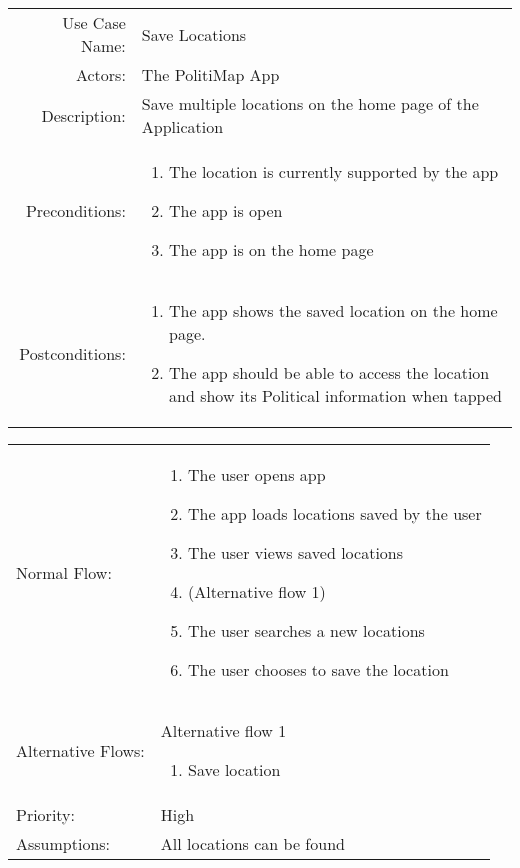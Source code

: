 \documentclass{beamer}
\begin{document}
\begin{frame}
\begin{tabu}{rX}
  Use Case Name: & Save Locations\\
  Actors: & The PolitiMap App\\
  Description: & Save multiple locations on the home page of the Application\\
  Preconditions: &
  \begin{enumerate}
  \item The location is currently supported by the app
  \item The app is open
  \item The app is on the home page
  \end{enumerate} \\
  Postconditions: &
  \begin{enumerate}
  \item The app shows the saved location on the home page.
  \item The app should be able to access the location and show its Political information when tapped
  \end{enumerate}
\end{tabu}\end{frame}
  \begin{frame}\begin{tabu}{lX}
  Normal Flow: &
  \begin{enumerate}
  \item The user opens app
  \item The app loads locations saved by the user
  \item The user views saved locations
  \item (Alternative flow 1)
  \item The user searches a new locations
  \item The user chooses to save the location
  \end{enumerate} \\
  Alternative Flows: &
  Alternative flow 1
  \begin{enumerate}
  \item Save location
  \end{enumerate} \\
  Priority: & High\\
  Assumptions: & All locations can be found\\
\end{tabu}
\end{frame}
\end{document}
